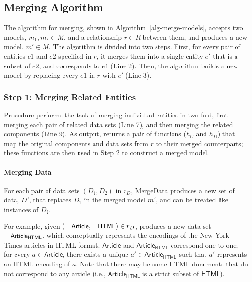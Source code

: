 \subsection{Merging Algorithm}

The algorithm for merging, shown in Algorithm~\ref{alg-merge-models},
accepts two models, $m_{1}, m_{2} \in M$, and a relationship $r \in R$
between them, and produces a new model, $m' \in M$. The algorithm is
divided into two steps. First, for every pair of entities $e1$ and
$e2$ specified in $r$, it merges them into a single entity $e'$ that is a
subset of $e2$, and corresponds to $e1$ (Line 2). Then, the algorithm
builds a new model by replacing every $e1$ in $r$ with $e'$ (Line 3).


\subsubsection{Step 1: Merging Related Entities}

Procedure  performs the task of merging individual
entities in two-fold, first merging each pair of related data sets
(Line 7), and then merging the related components (Line
9). As output,  returns a pair of functions
($h_{C}$ and $h_{D}$) that map the original components and data sets
from $r$ to their merged counterparts; these functions are then used
in Step 2 to construct a merged model.


\paragraph{\textbf{Merging Data}} For each pair of data sets $(D_{1},
D_{2})$ in $r_{D}$, \textsf{MergeData} produces a new set of data, $D'$,
that replaces $D_{1}$ in the merged model $m'$, and can be treated
like instances of $D_{2}$. 

For example, given $(\txtcname{Article}, \txtcname{HTML}) \in r_{D}$,  produces a new data set $\txtcname{Article}_{\textsf{HTML}}$, which conceptually represents the encodings of the New York Times articles in HTML format. $\textsf{Article}$ and $\textsf{Article}_{\textsf{HTML}}$ correspond one-to-one; for every $a \in \textsf{Article}$, there exists a unique $a' \in \textsf{Article}_{\textsf{HTML}}$ such that $a'$ represents an HTML encoding of $a$. Note that there may be some HTML documents that do not correspond to any article (i.e., $\textsf{Article}_{\textsf{HTML}}$ is a strict subset of $\textsf{HTML}$).

